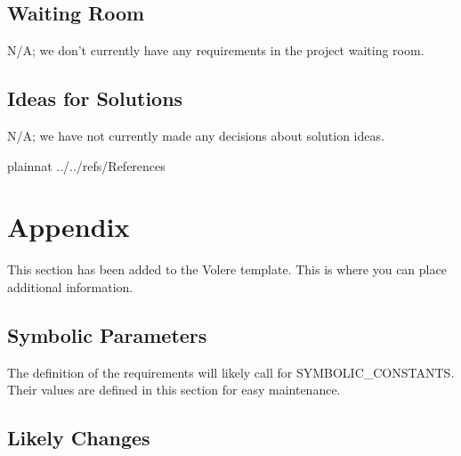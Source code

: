 \documentclass[12pt]{article}
\begin{document}
\subsection{Waiting Room}

N/A; we don't currently have any requirements in the project waiting room.

\subsection{Ideas for Solutions}

N/A; we have not currently made any decisions about solution ideas.

\newpage

 {plainnat}
 {../../refs/References}

\newpage

\section{Appendix}

This section has been added to the Volere template.  This is where you can place
additional information.

\subsection{Symbolic Parameters}

The definition of the requirements will likely call for SYMBOLIC\_CONSTANTS.
Their values are defined in this section for easy maintenance.

\subsection{Likely Changes}
\end{document}
